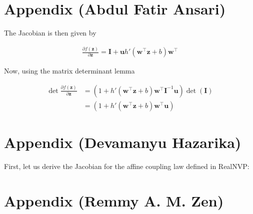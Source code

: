\documentclass[runningheads]{llncs}
\begin{document}
\section{Appendix (Abdul Fatir Ansari)}


The Jacobian is then given by

\begin{align*}
\frac{\partial f(\mathbf{z})}{\partial \mathbf{z}} = \mathbf{I} + \mathbf{u}h'(\mathbf{w}^\top\mathbf{z} + b)\mathbf{w}^\top
\end{align*}

Now, using the matrix determinant lemma

\begin{align}
\det\frac{\partial f(\mathbf{z})}{\partial \mathbf{z}} &= (1 + h'(\mathbf{w}^\top\mathbf{z} + b)\mathbf{w}^\top\mathbf{I}^{-1}\mathbf{u})\det(\mathbf{I})\\
&=(1 + h'(\mathbf{w}^\top\mathbf{z} + b)\mathbf{w}^\top\mathbf{u})\label{eq:planar-det}
\end{align}

\section{Appendix (Devamanyu Hazarika)}


First, let us derive the Jacobian for the affine coupling law defined in RealNVP:


\section{Appendix (Remmy A. M. Zen)}
\end{document}
